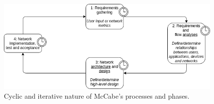\documentclass[conference]{IEEEtran}
\begin{document}
\begin{figure}[H]
\centering
\includegraphics[width=\columnwidth]{images/mccabe-process.png}
\caption{Cyclic and iterative nature of McCabe's processes and phases.}
\label{fig:mccabe-process}
\end{figure}

\end{document}
